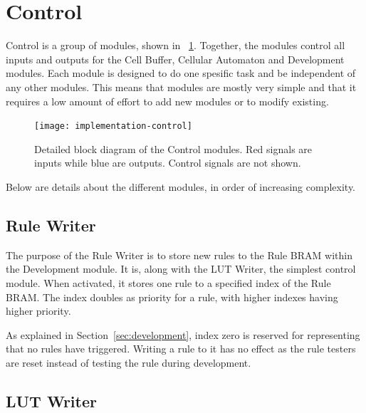 

\section{Control}

Control is a group of modules, shown in \figurename~\ref{fig:implementation-control}.
Together, the modules control all inputs and outputs for the Cell Buffer, Cellular Automaton and Development modules.
Each module is designed to do one spesific task and be independent of any other modules.
This means that modules are mostly very simple and that it requires a low amount of effort to add new modules or to modify existing.

\begin{figure}[!ht]
    \centering
    \texttt{[image: implementation-control]}
    \caption[Control modules]{
        Detailed block diagram of the Control modules.
        Red signals are inputs while blue are outputs.
        Control signals are not shown.
    }
    \label{fig:implementation-control}
\end{figure}

Below are details about the different modules, in order of increasing complexity.

\subsection{Rule Writer}

The purpose of the Rule Writer is to store new rules to the Rule BRAM within the Development module.
It is, along with the LUT Writer, the simplest control module.
When activated, it stores one rule to a specified index of the Rule BRAM.
The index doubles as priority for a rule, with higher indexes having higher priority.

As explained in Section~\ref{sec:development}, index zero is reserved for representing that no rules have triggered.
Writing a rule to it has no effect as the rule testers are reset instead of testing the rule during development.

\subsection{LUT Writer}

